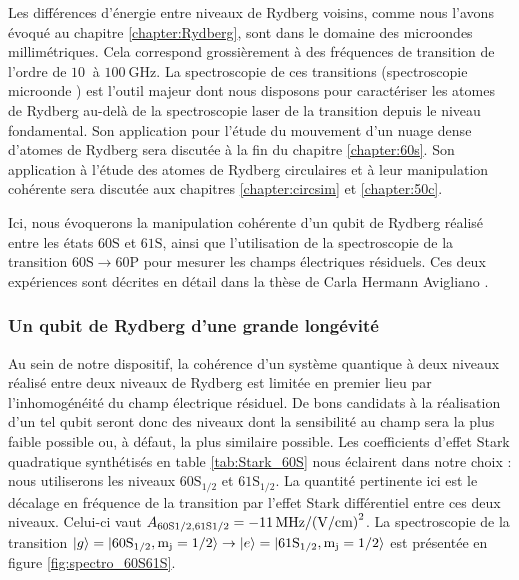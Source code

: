 Les différences d'énergie entre niveaux de Rydberg voisins, comme nous l'avons évoqué au chapitre \ref{chapter:Rydberg}, sont dans le domaine des microondes millimétriques.
Cela correspond grossièrement à des fréquences de transition de l'ordre de $\SI{10}{}$ à $\SI{100}{\GHz}$.
La spectroscopie de ces transitions (\og spectroscopie microonde \fg{}) est l'outil majeur dont nous disposons pour caractériser les atomes de Rydberg au-delà de la spectroscopie laser de la transition depuis le niveau fondamental.
Son application pour l'étude du mouvement d'un nuage dense d'atomes de Rydberg sera discutée à la fin du chapitre \ref{chapter:60s}.
Son application à l'étude des atomes de Rydberg circulaires et à leur manipulation cohérente sera discutée aux chapitres \ref{chapter:circsim} et \ref{chapter:50c}.

Ici, nous évoquerons la manipulation cohérente d'un \og qubit de Rydberg \fg{} réalisé entre les états $\mathrm{60S}$ et $\mathrm{61S}$, ainsi que l'utilisation de la spectroscopie de la transition $\mathrm{60S} \rightarrow \mathrm{60P}$ pour mesurer les champs électriques résiduels.
Ces deux expériences 
sont décrites en détail dans la thèse de Carla Hermann Avigliano \cite{PHD_HERMANN}.

\subsubsection*{Un qubit de Rydberg d'une grande longévité}
\noindent Au sein de notre dispositif, la cohérence d'un système quantique à deux niveaux réalisé entre deux niveaux de Rydberg est limitée en premier lieu par l'inhomogénéité du champ électrique résiduel.
De bons candidats à la réalisation d'un tel qubit seront donc des niveaux dont la sensibilité au champ sera la plus faible possible ou, à défaut, la plus similaire possible.
Les coefficients d'effet Stark quadratique synthétisés en table \eqref{tab:Stark_60S} nous éclairent dans notre choix : nous utiliserons les niveaux $\mathrm{60S_{1/2}}$ et $\mathrm{61S_{1/2}}$.
La quantité pertinente ici est le décalage en fréquence de la transition par l'effet Stark différentiel entre ces deux niveaux.
Celui-ci vaut $A_{\mathrm{60S1/2,61S1/2}} = \SI{-11}{\MHz \per (\V \per\cm) \squared}$.
La spectroscopie de la transition $\ket{g}=\ket{\mathrm{60S_{1/2},m_j=1/2}} \rightarrow \ket{e}=\ket{\mathrm{61S_{1/2},m_j=1/2}}$ est présentée en figure \eqref{fig:spectro_60S61S}.

